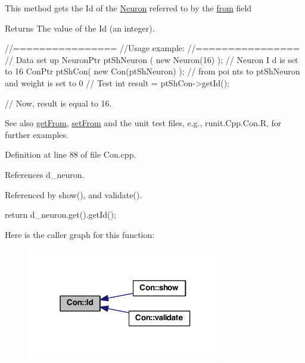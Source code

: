 This method gets the Id of the \hyperlink{class_neuron}{Neuron} referred to by the \hyperlink{class_con_a7c05f90dff56fd26c1fa0f042bba67a6}{from} field \begin{DoxyReturn}{Returns}
The value of the Id (an integer).
\end{DoxyReturn}

\begin{DoxyCode}
      //================
      //Usage example:
      //================
      // Data set up
                      NeuronPtr ptShNeuron ( new Neuron(16) );        // Neuron I
      d is set to 16
                      ConPtr ptShCon( new Con(ptShNeuron) );          // from poi
      nts to ptShNeuron and weight is set to 0
      // Test
                      int result = ptShCon->getId();

      // Now, result is equal to 16.
\end{DoxyCode}


\begin{DoxySeeAlso}{See also}
\hyperlink{class_con_a0c126eb4479324b156768e0810723423}{getFrom}, \hyperlink{class_con_a927378392a3ee1fe958b1670cb72e61d}{setFrom} and the unit test files, e.g., runit.Cpp.Con.R, for further examples. 
\end{DoxySeeAlso}


Definition at line 88 of file Con.cpp.



References d\_\-neuron.



Referenced by show(), and validate().


\begin{DoxyCode}
{
  return d_neuron.get().getId();
}
\end{DoxyCode}


Here is the caller graph for this function:\nopagebreak
\begin{figure}[H]
\begin{center}
\leavevmode
\includegraphics[width=244pt]{class_con_aee0a0b6c5beff6e227f9ebf33af2d209_icgraph}
\end{center}
\end{figure}


